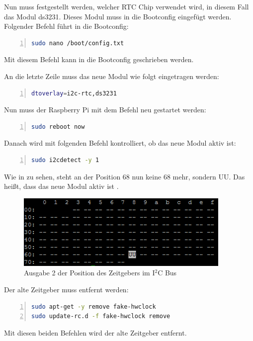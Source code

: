 Nun muss festgestellt werden, welcher RTC Chip verwendet wird, in diesem Fall das Modul ds3231. Dieses Modul muss in die Bootconfig eingefügt werden. Folgender Befehl führt in die Bootconfig:
\begin{lstlisting}[caption=Bootconfig,frame=single,numbers=left,language=bash,showstringspaces=false]
sudo nano /boot/config.txt
\end{lstlisting}
Mit diesem Befehl kann in die Bootconfig geschrieben werden.

An die letzte Zeile muss das neue Modul wie folgt eingetragen werden:
\begin{lstlisting}[caption=Eintrag Bootconfig,frame=single,numbers=left,language=bash,showstringspaces=false]
dtoverlay=i2c-rtc,ds3231
\end{lstlisting}

Nun muss der Raspberry Pi mit dem Befehl neu gestartet werden: 
\begin{lstlisting}[caption=Neustart Raspberry Pi,frame=single,numbers=left,language=bash,showstringspaces=false]
sudo reboot now
\end{lstlisting}
Danach wird mit folgenden Befehl kontrolliert, ob das neue Modul aktiv ist:
\begin{lstlisting}[caption=I2C-Bus Kontrolle,frame=single,numbers=left,language=bash,showstringspaces=false]
sudo i2cdetect -y 1
\end{lstlisting}
Wie in  zu sehen, steht an der Position 68 nun keine 68 mehr, sondern UU. Das heißt, dass das neue Modul aktiv ist . 
\begin{figure}[htp]
	\includegraphics[width=\textwidth]{Bilder/Kapitel4/2pos68.png}
	\caption[Ausgabe 2 der Position des Zeitgebers im I$^2$C Bus]{Ausgabe 2 der Position des Zeitgebers im I$^2$C Bus}
	\label{fig:Kapitel4/2pos68.png}
\end{figure}

Der alte Zeitgeber muss entfernt werden:
\begin{lstlisting}[caption=Entfernen des Zeitgebers,frame=single,numbers=left,language=bash,showstringspaces=false]
sudo apt-get -y remove fake-hwclock
sudo update-rc.d -f fake-hwclock remove
\end{lstlisting}
Mit diesen beiden Befehlen wird der alte Zeitgeber entfernt.

